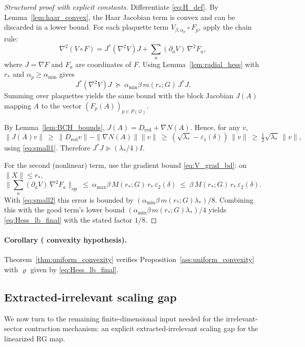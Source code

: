 \begin{proof}[Structured proof with explicit constants]
Differentiate \eqref{eq:H_def}. By Lemma~\ref{lem:haar_convex}, the Haar Jacobian term is convex and can be discarded in a lower bound.
For each plaquette term $V_{\beta,\alpha_p}\circ F_p$, apply the chain rule:
\[
\nabla^2(V\circ F)=J^\ast (\nabla^2 V)J + \sum_{a} (\partial_a V)\,\nabla^2 F_a,
\]
where $J=\nabla F$ and $F_a$ are coordinates of $F$.
Using Lemma~\ref{lem:radial_hess} with $r_\ast$ and $\alpha_p\ge \alpha_{\min}$ gives
\[
J^\ast(\nabla^2 V)J\ \succeq\ \alpha_{\min}\beta\,m(r_\ast;G)\,J^\ast J.
\]
Summing over plaquettes yields the same bound with the block Jacobian $J(A)$ mapping $A$ to the vector $(F_p(A))_{p\in P(\mathcal Q)}$.

By Lemma~\ref{lem:BCH_bounds}, $J(A)=D_{\mathrm{red}}+\nabla N(A)$.
Hence, for any $v$,
\[
\|J(A)v\|\ \ge\ \|D_{\mathrm{red}}v\|-\|\nabla N(A)\|\|v\|
\ \ge\ (\sqrt{\lambda_\ast}-\varepsilon_1(\delta))\,\|v\|
\ \ge\ \tfrac12\sqrt{\lambda_\ast}\,\|v\|,
\]
using \eqref{eq:small1}. Therefore $J^\ast J\succeq (\lambda_\ast/4)I$.

For the second (nonlinear) term, use the gradient bound \eqref{eq:V_grad_bd}:
on $\|X\|\le r_\ast$,
\[
\big\|\sum_a (\partial_a V)\,\nabla^2 F_a\big\|_{\mathrm{op}}
\ \le\ \alpha_{\max}\beta\,M(r_\ast;G)\,r_\ast\,\varepsilon_2(\delta)
\ \le\ \beta\,M(r_\ast;G)\,r_\ast\,\varepsilon_2(\delta).
\]
With \eqref{eq:small2} this error is bounded by $(\alpha_{\min}\beta\,m(r_\ast;G)\lambda_\ast)/8$.
Combining this with the good term's lower bound $(\alpha_{\min}\beta\,m(r_\ast;G)\lambda_\ast)/4$ yields \eqref{eq:Hess_lb_final} with the stated factor $1/8$.
\end{proof}

\paragraph{Corollary ( convexity hypothesis).}
Theorem~\ref{thm:uniform_convexity} verifies Proposition~\ref{ass:uniform_convexity} with $\varrho$ given by \eqref{eq:Hess_lb_final}.

\subsection{Extracted-irrelevant scaling gap}

We now turn to the remaining finite-dimensional input needed for the irrelevant-sector contraction mechanism:
an explicit extracted-irrelevant scaling gap for the linearized RG map.

